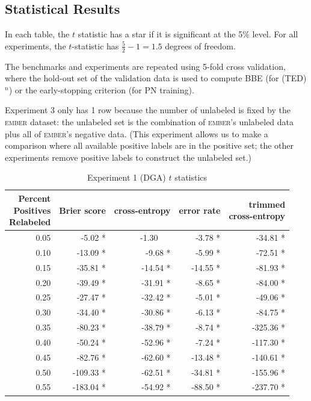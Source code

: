 \documentclass[conference]{IEEEtran}
\begin{document}
\subsection{Statistical Results}
\label{appendix:tables}

    In each table, the $t$ statistic has a star if it is significant at the 5\% level. For all experiments, the $t$-statistic has $\frac{5}{2}-1=1.5$ degrees of freedom.

    The benchmarks and experiments are repeated using 5-fold cross validation, where the hold-out set of the validation data is used to compute BBE (for (TED)${}^n$) or the early-stopping criterion (for PN training).

    Experiment 3 only has 1 row because the number of unlabeled is fixed by the \textsc{ember} dataset: the unlabeled set is the combination of \textsc{ember}'s unlabeled data plus all of \textsc{ember}'s negative data. (This experiment allows us to make a comparison where all available positive labels are in the positive set; the other experiments remove positive labels to construct the unlabeled set.)

    \begin{table}
    \caption{Experiment 1 (DGA) $t$ statistics}
    \label{tab:exp1}
        \begin{tabular}{r | r | r | r | r}
            \hline
                \makecell{Percent \\ Positives \\ Relabeled}
                & Brier score & cross-entropy & error rate & \makecell{trimmed \\ cross-entropy} \\
            \hline                                                    
                0.05  &           -5.02 *  &     -1.30~~~&   -3.78 *  &         -34.81 *\\
                0.10  &          -13.09 *  &     -9.68 * &   -5.99 *  &         -72.51 *\\
                0.15  &          -35.81 *  &    -14.54 * &  -14.55 *  &         -81.93 *\\
                0.20  &          -39.49 *  &    -31.91 * &   -8.65 *  &         -84.00 *\\
                0.25  &          -27.47 *  &    -32.42 * &   -5.01 *  &         -49.06 *\\
                0.30  &          -34.40 *  &    -30.86 * &   -6.13 *  &         -84.75 *\\
                0.35  &          -80.23 *  &    -38.79 * &   -8.74 *  &        -325.36 *\\
                0.40  &          -50.24 *  &    -52.96 * &   -7.24 *  &        -117.30 *\\
                0.45  &          -82.76 *  &    -62.60 * &  -13.48 *  &        -140.61 *\\
                0.50  &         -109.33 *  &    -62.51 * &  -34.81 *  &        -155.96 *\\
                0.55  &         -183.04 *  &    -54.92 * &  -88.50 *  &        -237.70 *
        \end{tabular}
    \end{table}
\end{document}

